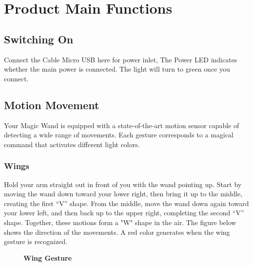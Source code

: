 %
%



\chapter{Product Main Functions}

\section{Switching On}\label{switching on}
Connect the Cable Micro USB here for power inlet, The Power LED indicates whether the main power is connected. The light will turn to green once you connect.

\section{Motion Movement}\label{Motion Movement}
Your Magic Wand is equipped with a state-of-the-art motion sensor capable of detecting a wide range of movements. Each gesture corresponds to a magical command that activates different light colors.

\subsection{Wings}
Hold your arm straight out in front of you with the wand pointing up. Start by moving the wand down toward your lower right, then bring it up to the middle, creating the first “V” shape. From the middle, move the wand down again toward your lower left, and then back up to the upper right, completing the second “V” shape. Together, these motions form a "W" shape in the air. The figure below shows the direction of the movements. A red color generates when the wing gesture is recognized.

\begin{figure}[h]
	\centering
	\caption{\textbf{Wing Gesture}}
	\label{fig:Wing_Gesture}
\end{figure}


